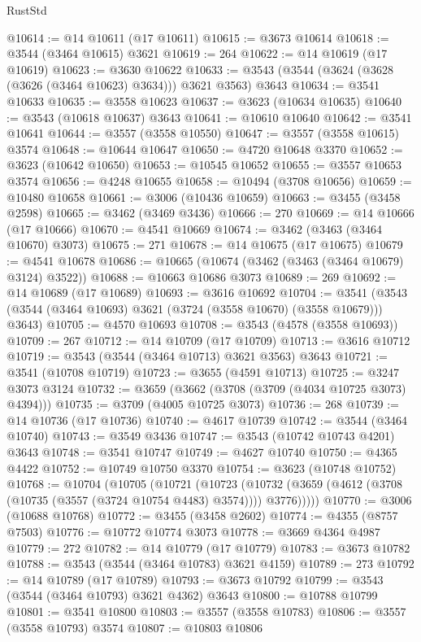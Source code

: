 \begin{lexlean}{RustStd}
\begin{coremodule}
@10614 := @14 @10611 (@17 @10611)
@10615 := @3673 @10614
@10618 := @3544 (@3464 @10615) @3621
@10619 := 264
@10622 := @14 @10619 (@17 @10619)
@10623 := @3630 @10622
@10633 := @3543 (@3544 (@3624 (@3628 (@3626 (@3464 @10623) @3634))) @3621 @3563) @3643
@10634 := @3541 @10633
@10635 := @3558 @10623
@10637 := @3623 (@10634 @10635)
@10640 := @3543 (@10618 @10637) @3643
@10641 := @10610 @10640
@10642 := @3541 @10641
@10644 := @3557 (@3558 @10550)
@10647 := @3557 (@3558 @10615) @3574
@10648 := @10644 @10647
@10650 := @4720 @10648 @3370
@10652 := @3623 (@10642 @10650)
@10653 := @10545 @10652
@10655 := @3557 @10653 @3574
@10656 := @4248 @10655
@10658 := @10494 (@3708 @10656)
@10659 := @10480 @10658
@10661 := @3006 (@10436 @10659)
@10663 := @3455 (@3458 @2598)
@10665 := @3462 (@3469 @3436)
@10666 := 270
@10669 := @14 @10666 (@17 @10666)
@10670 := @4541 @10669
@10674 := @3462 (@3463 (@3464 @10670) @3073)
@10675 := 271
@10678 := @14 @10675 (@17 @10675)
@10679 := @4541 @10678
@10686 := @10665 (@10674 (@3462 (@3463 (@3464 @10679) @3124) @3522))
@10688 := @10663 @10686 @3073
@10689 := 269
@10692 := @14 @10689 (@17 @10689)
@10693 := @3616 @10692
@10704 := @3541 (@3543 (@3544 (@3464 @10693) @3621 (@3724 (@3558 @10670) (@3558 @10679))) @3643)
@10705 := @4570 @10693
@10708 := @3543 (@4578 (@3558 @10693))
@10709 := 267
@10712 := @14 @10709 (@17 @10709)
@10713 := @3616 @10712
@10719 := @3543 (@3544 (@3464 @10713) @3621 @3563) @3643
@10721 := @3541 (@10708 @10719)
@10723 := @3655 (@4591 @10713)
@10725 := @3247 @3073 @3124
@10732 := @3659 (@3662 (@3708 (@3709 (@4034 @10725 @3073) @4394)))
@10735 := @3709 (@4005 @10725 @3073)
@10736 := 268
@10739 := @14 @10736 (@17 @10736)
@10740 := @4617 @10739
@10742 := @3544 (@3464 @10740)
@10743 := @3549 @3436
@10747 := @3543 (@10742 @10743 @4201) @3643
@10748 := @3541 @10747
@10749 := @4627 @10740
@10750 := @4365 @4422
@10752 := @10749 @10750 @3370
@10754 := @3623 (@10748 @10752)
@10768 := @10704
    (@10705
      (@10721
        (@10723
          (@10732 (@3659 (@4612 (@3708 (@10735 (@3557 (@3724 @10754 @4483) @3574)))) @3776)))))
@10770 := @3006 (@10688 @10768)
@10772 := @3455 (@3458 @2602)
@10774 := @4355 (@8757 @7503)
@10776 := @10772 @10774 @3073
@10778 := @3669 @4364 @4987
@10779 := 272
@10782 := @14 @10779 (@17 @10779)
@10783 := @3673 @10782
@10788 := @3543 (@3544 (@3464 @10783) @3621 @4159)
@10789 := 273
@10792 := @14 @10789 (@17 @10789)
@10793 := @3673 @10792
@10799 := @3543 (@3544 (@3464 @10793) @3621 @4362) @3643
@10800 := @10788 @10799
@10801 := @3541 @10800
@10803 := @3557 (@3558 @10783)
@10806 := @3557 (@3558 @10793) @3574
@10807 := @10803 @10806

\end{coremodule}
\end{lexlean}
